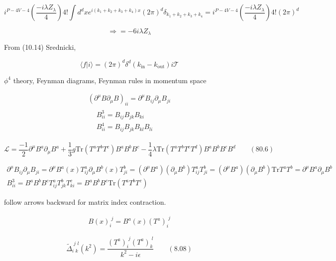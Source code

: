 \documentclass[twoside]{amsart}
\begin{document}
\[
i^{ P -4V -4 } \left( \frac{ -i \lambda Z_{\lambda }}{ 4} \right) 4! \int d^dx e^{i (k_1 + k_2 + k_3 +k_4)x } (2\pi)^d \delta_{k_1 + k_2 + k_3 + k_4 } = i^{ P - 4V - 4} \left( \frac{ -i \lambda Z_{\lambda }}{ 4} \right) 4! (2\pi)^d 
\]

\[
\Longrightarrow = -6 i\lambda Z_{\lambda}
\]

From (10.14) Srednicki,

\[
\langle f | i \rangle = (2\pi)^d \delta^d(k_{\text{in}}- k_{\text{out}} ) i \mathcal{T}
\]


$\phi^4$ theory, Feynman diagrams, Feynman rules in momentum space 



\[
\begin{gathered}
  ( \partial^{\mu} B \partial_{\mu} B )_{ii} = \partial^{\mu} B_{ij} \partial_{\mu} B_{ji} \\ 
  \begin{aligned}
    & B^3_{ii} = B_{ij} B_{jk} B_{ki} \\ 
    & B^4_{ii} = B_{ij} B_{jk} B_{kl} B_{li}
\end{aligned}
\end{gathered}
\]

\begin{equation}
\mathcal{L} = \frac{-1}{2} \partial^{\mu} B^a \partial_{\mu} B^a + \frac{1}{3} g \text{Tr}{ ( T^a T^b T^c ) } B^a B^b B^c - \frac{1}{4} \lambda \text{Tr}{ (T^a T^b T^c T^d )} B^a B^b B^c B^d \quad \quad (80.6)
\end{equation}

\[
\begin{gathered}
  \partial^{\mu} B_{ij} \partial_{\mu} B_{ji} = \partial^{\mu} B^a(x) T^a_{ij} \partial_{\mu} B^b(x) T^b_{ji} = ( \partial^{\mu} B^a) ( \partial_{\mu} B^b) T^a_{ij} T_{ji}^b = (\partial^{\mu} B^a)( \partial_{\mu} B^b) \text{Tr}{T^a T^b} = \partial^{\mu} B^a \partial_{\mu} B^b  \\
  B^3_{ii} = B^a B^b B^c T^a_{ij} T^b_{jk} T^c_{ki} = B^a B^b B^c \text{Tr}{ (T^a T^b T^c)}
\end{gathered}
\]

follow arrows backward for matrix index contraction.  

\[
\begin{gathered}
  B(x)_i^{ \, \, j } = B^a(x) (T^a)_i^{ \, \, j } 
\end{gathered}
\]


\begin{equation}
 \widetilde{\Delta}_{i \, \,  k }^{ \, \, j \, \, l }(k^2) = \frac{ (T^a)_i^{\, \, j } (T^a)_k^{ \, \, l } }{ k^2 - i \epsilon } \quad \quad (8.08)
\end{equation}
\end{document}
